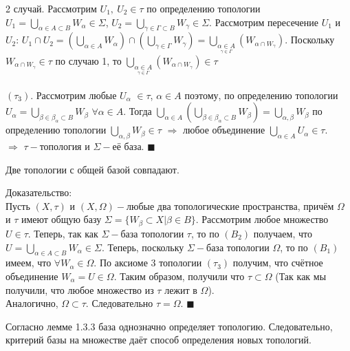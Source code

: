 \begin{theorem}
2 случай. Рассмотрим $U_1,\ U_2{\in}\tau$ по определению топологии $U_1=\bigcup\limits_{\alpha{\in}A{\subset}B}W_{\alpha}{\in}\Sigma$, $U_2=\bigcup\limits_{\gamma{\in}\Gamma{\subset}B}W_{\gamma}{\in}\Sigma$.
Рассмотрим пересечение $U_1$ и $U_2$: $U_1{\cap}U_2=(\bigcup\limits_{\alpha{\in}A}W_{\alpha}){\cap}(\bigcup\limits_{\gamma{\in}\Gamma}W_{\gamma})=\bigcup\limits_{\underset{\gamma{\in}\Gamma}{\alpha{\in}A}}(W_{\alpha{\cap}W_{\gamma}})$. Поскольку $W_{\alpha{\cap}W_{\gamma}}{\in}\tau$ по случаю 1, то $\bigcup\limits_{\underset{\gamma{\in}\Gamma}{\alpha{\in}A}}(W_{\alpha{\cap}W_{\gamma}}){\in}\tau$\\\\
$(\tau_3)$. Рассмотрим любые $U_{\alpha}$ $\in\tau$, $\alpha{\in}A$ поэтому, по определению топологии $U_{\alpha}=\bigcup\limits_{\beta{\in}\beta_{\alpha}{\subset}B}W_{\beta}$ $\forall\alpha{\in}A$. Тогда $\bigcup\limits_{\alpha{\in}A} (\bigcup\limits_{\beta{\in}\beta_{\alpha}{\subset}B}W_{\beta})=\bigcup\limits_{\alpha,\beta}W_{\beta}$ по определению топологии $\bigcup\limits_{\alpha,\beta}W_{\beta}{\in}\tau$ $\Rightarrow$ любое объединение $\bigcup\limits_{\alpha{\in}A}U_{\alpha}{\in}\tau$.\\
$\Rightarrow$ $\tau-$топология и $\Sigma-$её база. $\blacksquare$
\end{theorem}

\begin{lemma}
Две топологии с общей базой совпадают.

Доказательство:\\
Пусть $(X,\tau)$ и $(X,\Omega)-$любые два топологические пространства, причём $\Omega$ и $\tau$ имеют общую базу $\Sigma=\{W_{\beta}{\subset}X|\beta{\in}B\}$. Рассмотрим любое множество $U{\in}\tau$. Теперь, так как $\Sigma-$база топологии $\tau$, то по $(B_2)$ получаем, что $U=\bigcup\limits_{\alpha{\in}A{\subset}B}W_{\alpha}{\in}\Sigma$. Теперь, поскольку $\Sigma-$база топологии $\Omega$, то по $(B_1)$ имеем, что $\forall W_{\alpha}{\in}\Omega$. По аксиоме 3 топологии $(\tau_3)$ получим, что счётное объединение $W_{\alpha}=U{\in}\Omega$. Таким образом, получили что $\tau{\subset}\Omega$ (Так как мы получили, что любое множество из $\tau$ лежит в $\Omega$).  \\Аналогично, $\Omega{\subset}\tau$. Следовательно $\tau=\Omega$. $\blacksquare$ 
\end{lemma}
\begin{remark}
Согласно \textcolor{ocre}{лемме 1.3.3}  база однозначно определяет топологию. Следовательно, критерий базы на множестве даёт способ определения новых топологий.
\end{remark}
